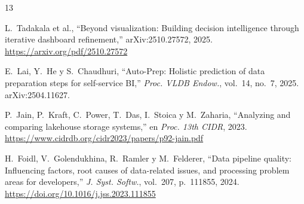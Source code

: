 \documentclass[10pt,twocolumn,spanish]{IEEEtran}
\begin{document}
\begin{thebibliography}{13}
\begin{sloppypar}
L.~Tadakala et al.,
``Beyond visualization: Building decision intelligence through
iterative dashboard refinement,''
arXiv:2510.27572, 2025.
\url{https://arxiv.org/pdf/2510.27572}

E.~Lai, Y.~He y S.~Chaudhuri,
``Auto-Prep: Holistic prediction of data preparation steps for
self-service BI,''
\textit{Proc. VLDB Endow.}, vol.~14, no.~7, 2025.
arXiv:2504.11627.

P.~Jain, P.~Kraft, C.~Power, T.~Das, I.~Stoica y M.~Zaharia,
``Analyzing and comparing lakehouse storage systems,''
en \textit{Proc. 13th CIDR}, 2023.
\url{https://www.cidrdb.org/cidr2023/papers/p92-jain.pdf}

H.~Foidl, V.~Golendukhina, R.~Ramler y M.~Felderer,
``Data pipeline quality: Influencing factors, root causes of
data-related issues, and processing problem areas for developers,''
\textit{J. Syst. Softw.}, vol.~207, p.~111855, 2024.
\url{https://doi.org/10.1016/j.jss.2023.111855}

\end{sloppypar}
\end{thebibliography}
\end{document}
